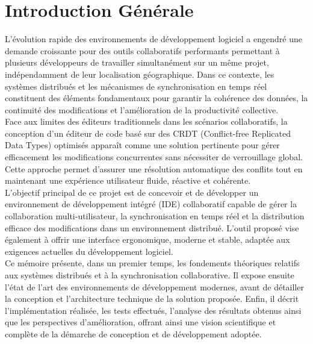 \documentclass[a4paper,oneside,12pt]{book}
\begin{document}


\chapter*{Introduction Générale}
\fancyhead[LE,LO]{\leftmark}
\fancyfoot[c]{}
L’évolution rapide des environnements de développement logiciel a engendré une demande croissante pour des outils collaboratifs performants permettant à plusieurs développeurs de travailler simultanément sur un même projet, indépendamment de leur localisation géographique. Dans ce contexte, les systèmes distribués et les mécanismes de synchronisation en temps réel constituent des éléments fondamentaux pour garantir la cohérence des données, la continuité des modifications et l’amélioration de la productivité collective.\\

Face aux limites des éditeurs traditionnels dans les scénarios collaboratifs, la conception d’un éditeur de code basé sur des CRDT (Conflict-free Replicated Data Types) optimisés apparaît comme une solution pertinente pour gérer efficacement les modifications concurrentes sans nécessiter de verrouillage global. Cette approche permet d’assurer une résolution automatique des conflits tout en maintenant une expérience utilisateur fluide, réactive et cohérente.\\

L’objectif principal de ce projet est de concevoir et de développer un environnement de développement intégré (IDE) collaboratif capable de gérer la collaboration multi-utilisateur, la synchronisation en temps réel et la distribution efficace des modifications dans un environnement distribué. L’outil proposé vise également à offrir une interface ergonomique, moderne et stable, adaptée aux exigences actuelles du développement logiciel.\\

Ce mémoire présente, dans un premier temps, les fondements théoriques relatifs aux systèmes distribués et à la synchronisation collaborative. Il expose ensuite l’état de l’art des environnements de développement modernes, avant de détailler la conception et l’architecture technique de la solution proposée. Enfin, il décrit l’implémentation réalisée, les tests effectués, l’analyse des résultats obtenus ainsi que les perspectives d’amélioration, offrant ainsi une vision scientifique et complète de la démarche de conception et de développement adoptée.
\end{document}

